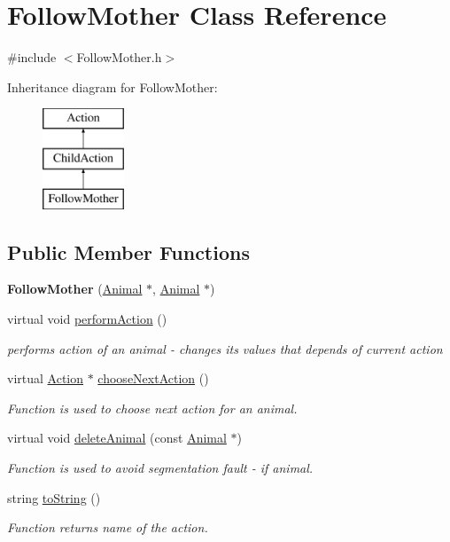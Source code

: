 \hypertarget{class_follow_mother}{}\section{Follow\+Mother Class Reference}
\label{class_follow_mother}


{\ttfamily \#include $<$Follow\+Mother.\+h$>$}

Inheritance diagram for Follow\+Mother\+:\begin{figure}[H]
\begin{center}
\leavevmode
\includegraphics[height=3.000000cm]{class_follow_mother}
\end{center}
\end{figure}
\subsection*{Public Member Functions}
\begin{DoxyCompactItemize}
\item 
\hypertarget{class_follow_mother_a0399072d549eafc52c0a738fe79a7b3e}{}{\bfseries Follow\+Mother} (\hyperlink{class_animal}{Animal} $\ast$, \hyperlink{class_animal}{Animal} $\ast$)\label{class_follow_mother_a0399072d549eafc52c0a738fe79a7b3e}

\item 
virtual void \hyperlink{class_follow_mother_ace13e303253ad224eb4ddb1f1f0c800d}{perform\+Action} ()
\begin{DoxyCompactList}\small\item\em performs action of an animal -\/ changes it\textquotesingle{}s values that depends of current action \end{DoxyCompactList}\item 
virtual \hyperlink{class_action}{Action} $\ast$ \hyperlink{class_follow_mother_aef94bc17f41a2873b6d2843054882617}{choose\+Next\+Action} ()
\begin{DoxyCompactList}\small\item\em Function is used to choose next action for an animal. \end{DoxyCompactList}\item 
virtual void \hyperlink{class_follow_mother_a0edf307dfd83b18c3817667f2d2af670}{delete\+Animal} (const \hyperlink{class_animal}{Animal} $\ast$)
\begin{DoxyCompactList}\small\item\em Function is used to avoid segmentation fault -\/ if animal. \end{DoxyCompactList}\item 
string \hyperlink{class_follow_mother_a90e915d9987b55223b7c0b8ebf99b4da}{to\+String} ()
\begin{DoxyCompactList}\small\item\em Function returns name of the action. \end{DoxyCompactList}\end{DoxyCompactItemize}
